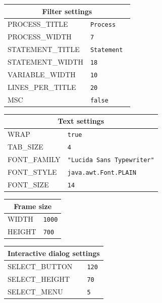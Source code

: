 \documentclass[11pt]{article}
\begin{document}
\begin{center}
\bigskip

\begin{tabular}{|p{}|p{}|}
\hline
\multicolumn{2}{|c|}{Filter settings}\\ \hline
\textsc{\ttfamily PROCESS\_TITLE} & \verb+Process +\\
\textsc{\ttfamily PROCESS\_WIDTH} & \verb+7+\\
\textsc{\ttfamily STATEMENT\_TITLE} & \verb+Statement +\\
\textsc{\ttfamily STATEMENT\_WIDTH} & \verb+18+\\
\textsc{\ttfamily VARIABLE\_WIDTH} &\verb+10+\\
\textsc{\ttfamily LINES\_PER\_TITLE} &\verb+20+\\
\textsc{\ttfamily MSC} &\verb+false+\\
\hline
\end{tabular}

\bigskip

\begin{tabular}{|p{}|p{}|}
\hline
\multicolumn{2}{|c|}{Text settings}\\ \hline
\textsc{\ttfamily WRAP} &\verb+true+\\
\textsc{\ttfamily TAB\_SIZE} &\verb+4+\\
\textsc{\ttfamily FONT\_FAMILY} & \verb+"Lucida Sans Typewriter"+\\ 
\textsc{\ttfamily FONT\_STYLE} & \verb+java.awt.Font.PLAIN+\\
\textsc{\ttfamily FONT\_SIZE} & \verb+14+\\\hline
\end{tabular}

\bigskip

\begin{tabular}{|p{}|p{}|}
\hline
\multicolumn{2}{|c|}{Frame size}\\ \hline
\textsc{\ttfamily WIDTH} &\verb+1000+\\
\textsc{\ttfamily HEIGHT} &\verb+700+\\\hline
\end{tabular}

\bigskip

\begin{tabular}{|p{}|p{}|}
\hline
\multicolumn{2}{|c|}{Interactive dialog settings}\\ \hline
\textsc{\ttfamily SELECT\_BUTTON} &\verb+120+\\
\textsc{\ttfamily SELECT\_HEIGHT} &\verb+70+\\
\textsc{\ttfamily SELECT\_MENU} &\verb+5+\\\hline
\end{tabular}


\end{center}
\end{document}
